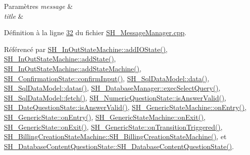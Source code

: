 \begin{DoxyParams}{Paramètres}
{\em message} & \\
\hline
{\em title} & \\
\hline
\end{DoxyParams}


Définition à la ligne \hyperlink{SH__MessageManager_8cpp_source_l00032}{32} du fichier \hyperlink{SH__MessageManager_8cpp_source}{S\-H\-\_\-\-Message\-Manager.\-cpp}.



Référencé par \hyperlink{classSH__InOutStateMachine_ab6e90f9e187ab70d51ed4e3e1f69f912}{S\-H\-\_\-\-In\-Out\-State\-Machine\-::add\-I\-O\-State()}, \hyperlink{classSH__InOutStateMachine_a3de9dedcdfd6efab868484c047638f71}{S\-H\-\_\-\-In\-Out\-State\-Machine\-::add\-State()}, \hyperlink{classSH__InOutStateMachine_a0814df2e3f2b776ba210f98cd05be70d}{S\-H\-\_\-\-In\-Out\-State\-Machine\-::add\-State\-Machine()}, \hyperlink{classSH__ConfirmationState_a039267260de5d102ac7511e6a5fae87f}{S\-H\-\_\-\-Confirmation\-State\-::confirm\-Input()}, \hyperlink{classSH__SqlDataModel_aa4664329d52c2d2cba2bacc42fa1a564}{S\-H\-\_\-\-Sql\-Data\-Model\-::data()}, \hyperlink{classSH__SqlDataModel_a24db284b370930b57e2261a7a72e2da8}{S\-H\-\_\-\-Sql\-Data\-Model\-::datas()}, \hyperlink{classSH__DatabaseManager_ab8f9850cb68444ab9a4e613b36a3b044}{S\-H\-\_\-\-Database\-Manager\-::exec\-Select\-Query()}, \hyperlink{classSH__SqlDataModel_ab6c206088250a66ddc8cb8d33a38e421}{S\-H\-\_\-\-Sql\-Data\-Model\-::fetch()}, \hyperlink{classSH__NumericQuestionState_a3676dec63a4da7cecf3fc28d8a197843}{S\-H\-\_\-\-Numeric\-Question\-State\-::is\-Answer\-Valid()}, \hyperlink{classSH__DateQuestionState_a303e9f86c37ded79fb3ad4d31d183c21}{S\-H\-\_\-\-Date\-Question\-State\-::is\-Answer\-Valid()}, \hyperlink{classSH__GenericStateMachine_adfd82f2532595ed7c4bcf21f03cbb951}{S\-H\-\_\-\-Generic\-State\-Machine\-::on\-Entry()}, \hyperlink{classSH__GenericState_a68c67ef95738e01cd34cd5926f4932fb}{S\-H\-\_\-\-Generic\-State\-::on\-Entry()}, \hyperlink{classSH__GenericStateMachine_a4b36d60fa1876908493d3d07f191a30f}{S\-H\-\_\-\-Generic\-State\-Machine\-::on\-Exit()}, \hyperlink{classSH__GenericState_a7f7863859318c70c9b734be5bf5510b0}{S\-H\-\_\-\-Generic\-State\-::on\-Exit()}, \hyperlink{classSH__GenericState_aad4259cc1e6a51681d6a92e995486380}{S\-H\-\_\-\-Generic\-State\-::on\-Transition\-Triggered()}, \hyperlink{classSH__BillingCreationStateMachine_ad62b77fa4aeafe200056ff3974562f83}{S\-H\-\_\-\-Billing\-Creation\-State\-Machine\-::\-S\-H\-\_\-\-Billing\-Creation\-State\-Machine()}, et \hyperlink{classSH__DatabaseContentQuestionState_ab26490ea519262a8f9ca72c000bf7313}{S\-H\-\_\-\-Database\-Content\-Question\-State\-::\-S\-H\-\_\-\-Database\-Content\-Question\-State()}.


